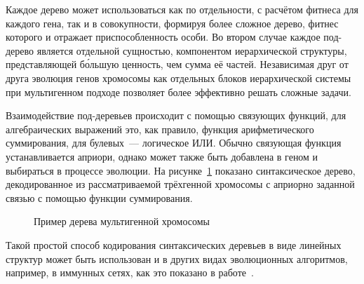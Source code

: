 Каждое дерево может использоваться как по отдельности, с расчётом фитнеса для каждого гена, так и в совокупности, формируя более сложное дерево, фитнес которого и отражает приспособленность особи. Во втором случае каждое под-дерево является отдельной сущностью, компонентом иерархической структуры, представляющей б\'{о}льшую ценность, чем сумма её частей. Независимая друг от друга эволюция генов хромосомы как отдельных блоков иерархической системы при мультигенном подходе позволяет более эффективно решать сложные задачи.

Взаимодействие под-деревьев происходит с помощью связующих функций, для алгебраических выражений это, как правило, функция арифметического суммирования, для булевых~--- логическое ИЛИ. Обычно связующая функция устанавливается априори, однако может также быть добавлена в геном и выбираться в процессе эволюции. На рисунке~\ref{img:GEP_ET_sample_2} показано синтаксическое дерево, декодированное из рассматриваемой трёхгенной хромосомы с априорно заданной связью с помощью функции суммирования.

\begin{figure} [h]
  \center
  \caption{Пример дерева мультигенной хромосомы}
  \label{img:GEP_ET_sample_2}
\end{figure}

Такой простой способ кодирования синтаксических деревьев в виде линейных структур может быть использован и в других видах эволюционных алгоритмов, например, в иммунных сетях, как это показано в работе~\cite{karakasis2008efficient}.

